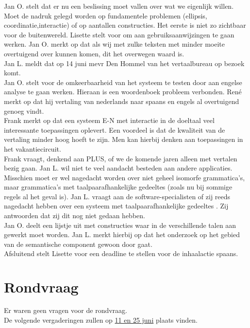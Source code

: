 \noindent Jan O. stelt dat er nu een beslissing moet vallen over wat we eigenlijk 
willen. Moet de nadruk gelegd worden op fundamentele problemen (ellipsis, 
coordinatie,interactie) of op aantallen constructies.
Het eerste is niet zo zichtbaar voor de buitenwereld. Lisette stelt voor om aan 
gebruiksaanwijzingen te gaan werken. Jan O. merkt op dat als wij met zulke 
teksten met minder moeite overtuigend over kunnen komen, dit het overwegen 
waard is.\\

\noindent Jan L. meldt dat op 14 juni mevr Den Hommel van het 
vertaalbureau op bezoek komt.\\

\noindent Jan O. stelt voor de omkeerbaarheid van het systeem te testen door 
aan engelse analyse te gaan werken. Hieraan is een woordenboek probleem 
verbonden. Ren\'{e} merkt op dat hij vertaling van nederlands naar spaans 
en engels al overtuigend genoeg vindt.\\

\noindent Frank merkt op dat een systeem E-N met interactie in de doeltaal veel 
interessante toepassingen oplevert. Een voordeel is dat de 
kwaliteit van de vertaling minder 
hoog hoeft te zijn. Men kan hierbij denken aan toepassingen in het 
vakantiecircuit.\\

\noindent Frank vraagt, denkend aan PLUS, of we de komende jaren alleen met vertalen 
bezig gaan. Jan L. wil niet te veel aandacht besteden aan andere applicaties. 
Misschien moet er wel nagedacht worden over niet geheel isomorfe grammatica's, 
maar grammatica's met taalpaarafhankelijke gedeeltes (zoals nu bij sommige 
regels al het geval is). Jan L. vraagt aan de software-specialisten of zij
 reeds nagedacht hebben over een systeem met taalpaarafhankelijke gedeeltes
. Zij antwoorden dat zij dit nog niet gedaan hebben.\\

\noindent Jan O. deelt een lijstje uit met constructies waar in de verschillende talen 
aan gewerkt moet worden. Jan L. merkt hierbij op dat het onderzoek op het 
gebied van de semantische component gewoon door gaat.\\

\noindent Afsluitend stelt Lisette voor een deadline te stellen voor de inhaalactie 
spaans.\\

\section {Rondvraag}

Er waren geen vragen voor de rondvraag.\\

\noindent De volgende vergaderingen zullen op \underline {11 en 25 juni} 
plaats vinden. 


